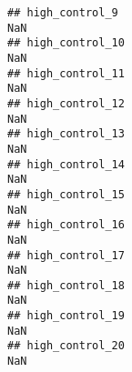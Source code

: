 \documentclass[
]{article}
\begin{document}
\begin{verbatim}
## high_control_9                                                                                                                                                                                                                  NaN
## high_control_10                                                                                                                                                                                                                 NaN
## high_control_11                                                                                                                                                                                                                 NaN
## high_control_12                                                                                                                                                                                                                 NaN
## high_control_13                                                                                                                                                                                                                 NaN
## high_control_14                                                                                                                                                                                                                 NaN
## high_control_15                                                                                                                                                                                                                 NaN
## high_control_16                                                                                                                                                                                                                 NaN
## high_control_17                                                                                                                                                                                                                 NaN
## high_control_18                                                                                                                                                                                                                 NaN
## high_control_19                                                                                                                                                                                                                 NaN
## high_control_20                                                                                                                                                                                                                 NaN

\end{verbatim}
\end{document}
